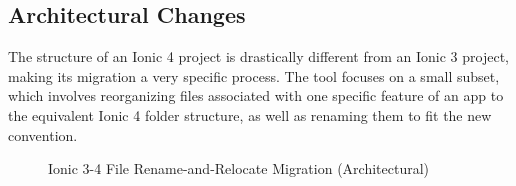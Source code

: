 \documentclass[conference]{IEEEtran}
\begin{document}
\subsection{Architectural Changes}
The structure of an Ionic 4 project is drastically different from an Ionic 3 project,
making its migration a very specific process. The tool focuses on a small subset, which
involves reorganizing files associated with one specific feature of an app to the equivalent Ionic 4
folder structure, as well as renaming them to fit the new convention.
\begin{figure}[!htb]
    \centering
    \caption{Ionic 3-4 File Rename-and-Relocate Migration (Architectural)}
    \label{fig:ionicFileMigration}
\end{figure}
\end{document}
